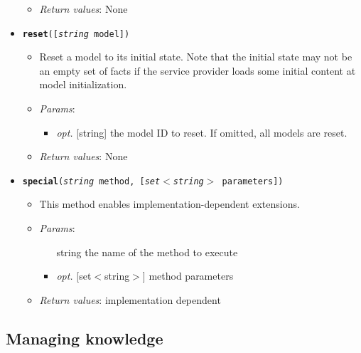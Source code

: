 \begin{itemize}
\begin{itemize}
\item  \emph{Return values}: None
\end{itemize}

\item  \texttt{\textbf{reset}([\emph{string} model])}
\begin{itemize}
\item  Reset a model to its initial state. Note that the initial state may not be an empty set of facts if the service provider loads some initial content at model initialization.
\item  \emph{Params}:
\begin{itemize}
\item  \emph{opt.} [string] the model ID to reset. If omitted, all models are reset. 
\end{itemize}

\item  \emph{Return values}: None
\end{itemize}

\item  \texttt{\textbf{special}(\emph{string} method, [\emph{set$<$string$>$} parameters])}
\begin{itemize}
\item  This method enables implementation-dependent extensions.
\item  \emph{Params}:
\begin{itemize}
\item  [string] the name of the method to execute
\item  \emph{opt.} [set$<$string$>$] method parameters
\end{itemize}

\item  \emph{Return values}: implementation dependent
\end{itemize}

\end{itemize}

\subsection{Managing knowledge}


